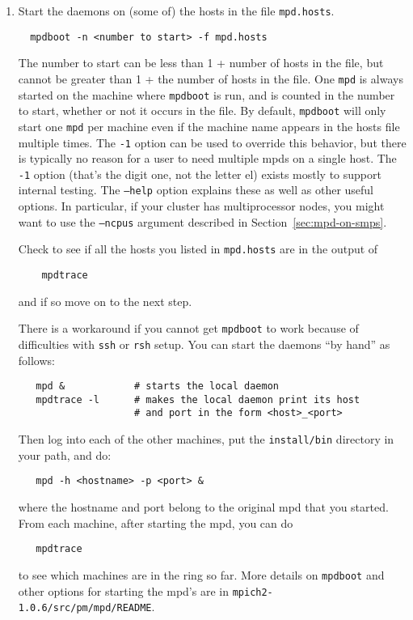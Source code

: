 \documentclass[dvipdfm,11pt]{article}
\begin{document}
\begin{enumerate}
\item
Start the daemons on (some of) the hosts in the file \texttt{mpd.hosts}.
\begin{verbatim}
  mpdboot -n <number to start> -f mpd.hosts
\end{verbatim}
The number to start can be less than 1 + number of hosts in the
file, but cannot be greater than 1 + the number of hosts in the
file.  One \texttt{mpd} is always started on the machine where
\texttt{mpdboot} is 
run, and is counted in the number to start, whether or not it occurs
in the file.  By default, \texttt{mpdboot} will only start one \texttt{mpd} per
machine even if the machine name appears in the hosts file multiple times.
The \texttt{-1} option can be used to override this behavior, but there is typically
no reason for a user to need multiple mpds on a single host.
The \texttt{-1} option (that's the digit one, not the letter el) exists mostly
to support internal testing. 
The \texttt{--help} option explains these as well as other useful
options.  In particular, if your cluster has multiprocessor nodes, you
might want to use the \texttt{--ncpus} argument described in 
Section~\ref{sec:mpd-on-smps}.

Check to see if all the hosts you listed in \texttt{mpd.hosts} are in the output
of 
\begin{verbatim}
    mpdtrace
\end{verbatim}
and if so move on to the next step.

There is a workaround if you cannot get \texttt{mpdboot} to work because of 
difficulties with \texttt{ssh} or \texttt{rsh} setup.  You can start the
daemons ``by 
hand'' as follows:
\begin{verbatim}
   mpd &            # starts the local daemon
   mpdtrace -l      # makes the local daemon print its host
                    # and port in the form <host>_<port>
\end{verbatim}
Then log into each of the other machines, put the \texttt{install/bin}
directory in your path, and do:
\begin{verbatim}
   mpd -h <hostname> -p <port> &
\end{verbatim}
where the hostname and port belong to the original mpd that you
started.  From each machine, after starting the mpd, you can do 
\begin{verbatim}
   mpdtrace
\end{verbatim}
to see which machines are in the ring so far.  More details on
\texttt{mpdboot} and other options for starting the mpd's are in
\texttt{mpich2-1.0.6/src/pm/mpd/README}.


\end{enumerate}
\end{document}
